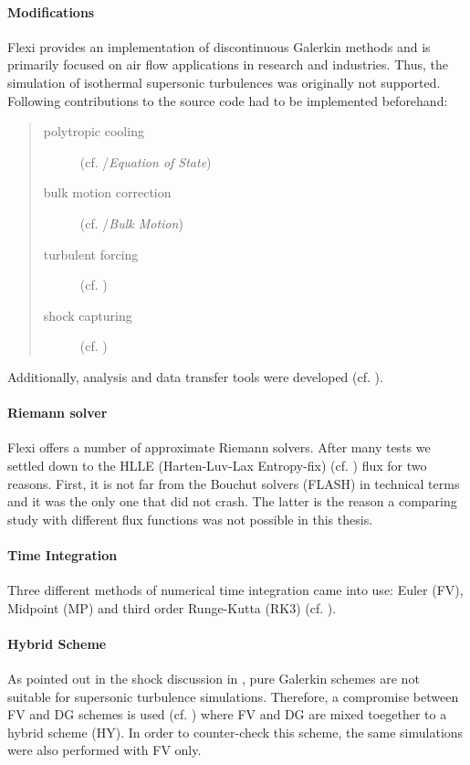 \paragraph{Modifications}
Flexi provides an implementation of discontinuous Galerkin methods and is
primarily focused on air flow applications in research and industries. Thus,
the simulation of isothermal supersonic turbulences was originally not
supported.  Following contributions to the source code had to be implemented
beforehand:
\begin{quote}
\begin{description}
    \item [polytropic cooling] (cf. /\emph{Equation of State})
    \item [bulk motion correction] (cf. /\emph{Bulk Motion})
    \item [turbulent forcing] (cf. )
    \item [shock capturing] (cf. )
\end{description}
\end{quote}
Additionally, analysis and data transfer tools were developed (cf. ).

\paragraph{Riemann solver}
Flexi offers a number of approximate Riemann solvers. After many tests we
settled down to the HLLE (Harten-Luv-Lax Entropy-fix) (cf. \cite{balsara_2010})
flux for two reasons.  First, it is not far from the Bouchut solvers (FLASH) in
technical terms and it was the only one that did not crash. The latter is the
reason a comparing study with different flux functions was not possible in this
thesis.

\paragraph{Time Integration}
Three different methods of numerical time integration came into use: Euler (FV),
Midpoint (MP) and third order Runge-Kutta (RK3) (cf. ).

\paragraph{Hybrid Scheme}
As pointed out in the shock discussion in , pure Galerkin schemes
are not suitable for supersonic turbulence simulations. Therefore, a compromise
between FV and DG schemes is used (cf. ) where FV and DG
are mixed toegether to a hybrid scheme (HY). In order to counter-check this scheme,
the same simulations were also performed with FV only.
